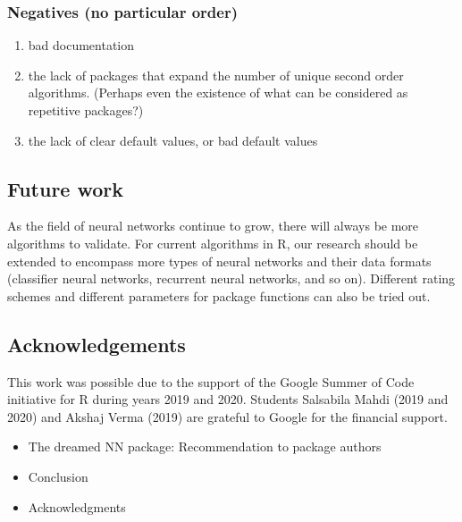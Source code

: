 \hypertarget{negatives-no-particular-order}{%
\subsubsection{Negatives (no particular
order)}\label{negatives-no-particular-order}}

\begin{enumerate}
\def\labelenumi{\arabic{enumi}.}
\tightlist
\item
  bad documentation
\item
  the lack of packages that expand the number of unique second order
  algorithms. (Perhaps even the existence of what can be considered as
  repetitive packages?)
\item
  the lack of clear default values, or bad default values
\end{enumerate}

\hypertarget{future-work}{%
\subsection{Future work}\label{future-work}}

As the field of neural networks continue to grow, there will always be
more algorithms to validate. For current algorithms in R, our research
should be extended to encompass more types of neural networks and their
data formats (classifier neural networks, recurrent neural networks, and
so on). Different rating schemes and different parameters for package
functions can also be tried out.

\hypertarget{acknowledgements}{%
\subsection{Acknowledgements}\label{acknowledgements}}

This work was possible due to the support of the Google Summer of Code
initiative for R during years 2019 and 2020. Students Salsabila Mahdi
(2019 and 2020) and Akshaj Verma (2019) are grateful to Google for the
financial support.



\begin{itemize}
\tightlist
\item
  The dreamed NN package: Recommendation to package authors
\item
  Conclusion
\item
  Acknowledgments
\end{itemize}

